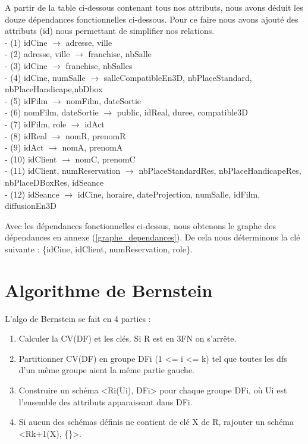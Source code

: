 \documentclass[a4paper,sffamily,12pt]{article}
\begin{document}
		\vspace{0.5cm}
	
		A partir de la table ci-dessous contenant tous nos attributs, nous avons déduit les douze dépendances fonctionnelles ci-dessous. Pour ce faire nous avons ajouté des attributs (id) nous permettant de simplifier nos relations.\\
	
		\noindent- (1) idCine $\rightarrow$ adresse, ville \\
		- (2) adresse, ville $\rightarrow$ franchise, nbSalle \\
		- (3) idCine $\rightarrow$ franchise, nbSalles \\
		- (4) idCine, numSalle $\rightarrow$ salleCompatibleEn3D, nbPlaceStandard, nbPlaceHandicape,nbDbox \\
 		- (5) idFilm $\rightarrow$ nomFilm, dateSortie \\
		- (6) nomFilm, dateSortie $\rightarrow$ public, idReal, duree, compatible3D \\
		- (7) idFilm, role $\rightarrow$  idAct \\
		- (8) idReal $\rightarrow$ nomR, prenomR \\
		- (9) idAct $\rightarrow$ nomA, prenomA \\
		- (10) idClient $\rightarrow$ nomC, prenomC \\
		- (11) idClient, numReservation $\rightarrow$ nbPlaceStandardRes, nbPlaceHandicapeRes, nbPlaceDBoxRes, idSeance \\
		- (12) idSeance $\rightarrow$ idCine, horaire, dateProjection, numSalle, idFilm, diffusionEn3D \\
		
		\newpage
		
		Avec les dépendances fonctionnelles ci-dessus, nous obtenons le graphe des dépendances en annexe (\ref{graphe_dependances}). De cela nous déterminons la clé suivante : \{idCine, idClient, numReservation, role\}.
		
	\section{Algorithme de Bernstein}
	
		\vspace{0.5cm}

		\noindent L'algo de Bernstein se fait en 4 parties :
	
			\begin{enumerate}[label=\ding{228}]
				\item Calculer la CV(DF) et les clés. Si R est en 3FN on s'arrête. 
				\item Partitionner CV(DF) en groupe DFi (1 <= i <= k) tel que toutes les dfs d'un même groupe aient la même partie gauche. 
				\item Construire un schéma <Ri(Ui), DFi> pour chaque groupe DFi, où Ui est l'ensemble des attributs apparaissant dans DFi.
				\item Si aucun des schémas définis ne contient de clé X de R, rajouter un schéma <Rk+1(X), \{\}>.
			\end{enumerate}	
			
\end{document}
